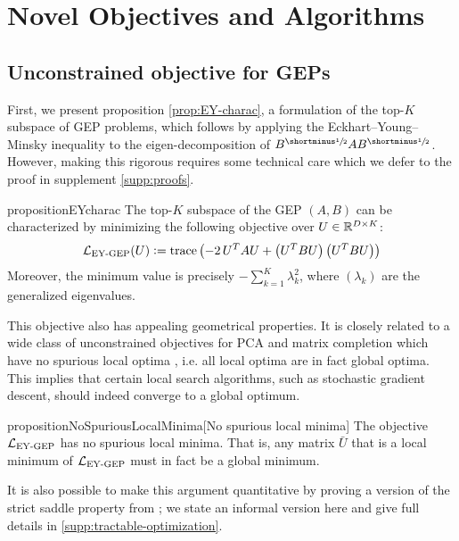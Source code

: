 \section{Novel Objectives and Algorithms}\label{sec:contributions}
\subsection{Unconstrained objective for GEPs}\label{sec:gep-ey-formulation}
First, we present proposition \ref{prop:EY-charac}, a formulation of the top-$K$ subspace of GEP problems, which follows by applying the Eckhart--Young--Minsky inequality \citep{stewart_matrix_1990} to the eigen-decomposition of $B^\mhalf A B^\mhalf$. However, making this rigorous requires some technical care which we defer to the proof in supplement \ref{supp:proofs}.

\begin{restatable}{proposition}{EYcharac}
    \label{prop:EY-charac}
    The top-$K$ subspace of the GEP $(A,B)$ can be characterized by minimizing the following objective over $U \in \mathbb{R}^{D \times K}$:
    \begin{align}\label{eq:EY-charac}
    \mathcal{L}_\text{EY-GEP}(U) \vcentcolon= \operatorname{trace} \left( - 2\,U^T A U + \left(U^T B U\right) \left(U^T B U\right) \right)
    \end{align}
    Moreover, the minimum value is precisely $- \sum_{k=1}^K \lambda_k^2$, where $(\lambda_k)$ are the generalized eigenvalues.
\end{restatable}

This objective also has appealing geometrical properties.
It is closely related to a wide class of unconstrained objectives for PCA and matrix completion which have no spurious local optima \citep{ge_no_2017}, i.e. all local optima are in fact global optima.
This implies that certain local search algorithms, such as stochastic gradient descent, should indeed converge to a global optimum.

\begin{restatable}{proposition}{NoSpuriousLocalMinima}[No spurious local minima]\label{prop:no-spurious}
The objective $\mathcal{L}_\text{EY-GEP}$ has no spurious local minima.
That is, any matrix $\bar{U}$ that is a local minimum of $\mathcal{L}_\text{EY-GEP}$ must in fact be a global minimum.
\end{restatable}

It is also possible to make this argument quantitative by proving a version of the strict saddle property from \cite{ge_no_2017,ge2015escaping}; we state an informal version here and give full details in \cref{supp:tractable-optimization}.

